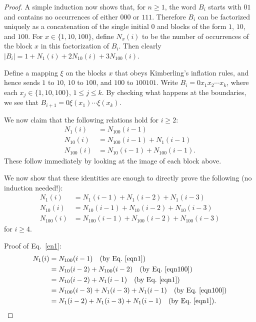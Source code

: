 \documentclass[10pt,a4paper]{amsart}
\begin{document}
\begin{proof}
A simple induction now shows that, for $n \geq 1$, the word $B_i$ starts with $01$
and contains no occurrences of either $000$ or $111$.  Therefore $B_i$ can be
factorized uniquely as a concatenation of the single initial $0$ and blocks of the
form $1$, $10$, and $100$.  For $x \in \{ 1, 10, 100 \}$, define $N_x (i)$ to be
the number of occurrences of the block $x$ in this
factorization of $B_i$.  Then clearly
$|B_i| = 1 + N_1(i) + 2N_{10} (i) + 3N_{100} (i)$.

Define a mapping $\xi$ on the blocks $x$ that obeys Kimberling's inflation 
rules, and hence sends $1$ to $10$, $10$ to $100$, and
$100$ to $100101$.  Write $B_i = 0 x_1 x_2 \cdots x_k$, where each $x_j \in \{ 1, 10, 100 \}$, $1 \leq j \leq k$. By checking what happens at the boundaries, we see that $B_{i+1} = 0 \xi(x_1) \cdots \xi(x_k)$.  

We now claim that the following relations hold for $i \geq 2$:
\begin{align}
N_1 (i) &= N_{100} (i-1) \label{eqn1} \\
N_{10} (i) &= N_{100} (i-1) + N_1 (i-1) \label{eqn10} \\
N_{100} (i) &= N_{10} (i-1) + N_{100} (i-1). \label{eqn100}
\end{align}
These follow immediately by looking at the image of each block above.

We now show that these identities are enough to directly prove the following (no induction needed!):
\begin{align}
N_1 (i) &= N_1(i-1) + N_1(i-2) + N_1(i-3) \label{en1}\\
N_{10} (i) &= N_{10}(i-1) + N_{10}(i-2) + N_{10}(i-3) \label{n10} \\
N_{100} (i) &= N_{100}(i-1) + N_{100}(i-2) + N_{100} (i-3) \label{n100} 
\end{align}
for $i \geq 4$. 

Proof of Eq.~\eqref{en1}:
\begin{align*}
N_1 (i) &= N_{100} (i-1) \quad \text{(by Eq.~\eqref{eqn1})}\\
&= N_{10} (i-2) + N_{100}(i-2)  \quad \text{(by Eq.~\eqref{eqn100})}\\
&= N_{10} (i-2) + N_1(i-1)  \quad \text{(by Eq.~\eqref{eqn1})} \\
&= N_{100} (i-3) + N_1(i-3) + N_1(i-1) \quad \text{(by Eq.~\eqref{eqn100})} \\
&= N_1(i-2) + N_1(i-3) + N_1(i-1) \quad \text{(by Eq.~\eqref{eqn1})} .
\end{align*}


\end{proof}
\end{document}
